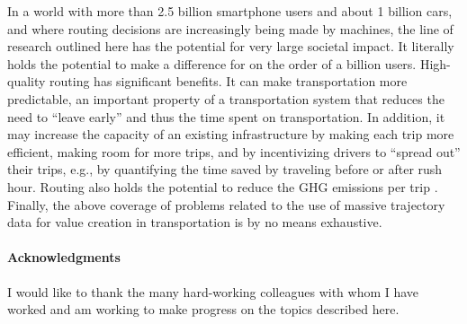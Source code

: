 \documentclass[11pt]{article}
\begin{document}
In a world with more than 2.5 billion smartphone users and about 1 billion cars, and where routing decisions are increasingly being made by machines, the line of research outlined here has the potential for very large societal impact. It literally holds the potential to make a difference for on the order of a billion users. High-quality routing has significant benefits. It can make transportation more predictable, an important property of a transportation system that reduces the need to ``leave early'' and thus the time spent on transportation. In addition, it may increase the capacity of an existing infrastructure by making each trip more efficient, making room for more trips, and by incentivizing drivers to ``spread out'' their trips, e.g., by quantifying the time saved by traveling before or after rush hour. Routing also holds the potential to reduce the GHG emissions per trip \cite{16,17}. Finally, the above coverage of problems related to the use of massive trajectory data for value creation in transportation is by no means exhaustive. 

\paragraph{Acknowledgments} I would like to thank the many hard-working colleagues with whom I have worked and am working to make progress on the topics described here.
\end{document}
